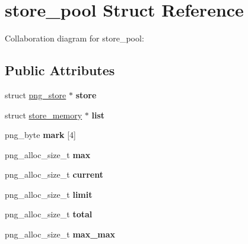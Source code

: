 \hypertarget{structstore__pool}{\section{store\+\_\+pool Struct Reference}
\label{structstore__pool}
}


Collaboration diagram for store\+\_\+pool\+:
\subsection*{Public Attributes}
\begin{DoxyCompactItemize}
\item 
\hypertarget{structstore__pool_ac66d43a4847f9b1ded6c8d4f2e1f8226}{struct \hyperlink{structpng__store}{png\+\_\+store} $\ast$ {\bfseries store}}\label{structstore__pool_ac66d43a4847f9b1ded6c8d4f2e1f8226}

\item 
\hypertarget{structstore__pool_a9c2eb511ba901870ce0514afbc3f5c2a}{struct \hyperlink{structstore__memory}{store\+\_\+memory} $\ast$ {\bfseries list}}\label{structstore__pool_a9c2eb511ba901870ce0514afbc3f5c2a}

\item 
\hypertarget{structstore__pool_a05cb348a4bf9783d051db6d6b06b064e}{png\+\_\+byte {\bfseries mark} \mbox{[}4\mbox{]}}\label{structstore__pool_a05cb348a4bf9783d051db6d6b06b064e}

\item 
\hypertarget{structstore__pool_aa962e8343c5a7fe6f96c84619c234016}{png\+\_\+alloc\+\_\+size\+\_\+t {\bfseries max}}\label{structstore__pool_aa962e8343c5a7fe6f96c84619c234016}

\item 
\hypertarget{structstore__pool_a5fdebb3ab9eb7568f7e16e813970c0e7}{png\+\_\+alloc\+\_\+size\+\_\+t {\bfseries current}}\label{structstore__pool_a5fdebb3ab9eb7568f7e16e813970c0e7}

\item 
\hypertarget{structstore__pool_adee044e12f3bc28cba0f9931e37c4948}{png\+\_\+alloc\+\_\+size\+\_\+t {\bfseries limit}}\label{structstore__pool_adee044e12f3bc28cba0f9931e37c4948}

\item 
\hypertarget{structstore__pool_af706a210a6650ed8c0753e51867c630a}{png\+\_\+alloc\+\_\+size\+\_\+t {\bfseries total}}\label{structstore__pool_af706a210a6650ed8c0753e51867c630a}

\item 
\hypertarget{structstore__pool_ab5d0f5391cda8ca7f0db18f1ce94fd7b}{png\+\_\+alloc\+\_\+size\+\_\+t {\bfseries max\+\_\+max}}\label{structstore__pool_ab5d0f5391cda8ca7f0db18f1ce94fd7b}


\end{DoxyCompactItemize}
